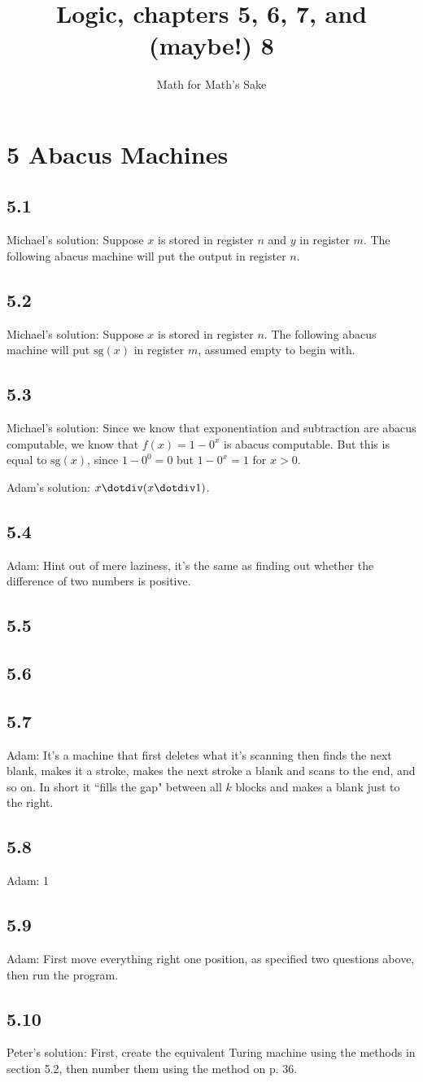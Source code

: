 \documentclass{article}
\title{Logic, chapters 5, 6, 7, and (maybe!) 8}
\author{Math for Math's Sake}
\newcommand\s{\section*}
\renewcommand\ss{\subsection*}
\newcommand\ms{Michael's solution: } %
\newcommand\pf{Peter's solution: } %
\begin{document}
\maketitle
\s{5 Abacus Machines}
\ss{5.1}
\ms Suppose $x$ is stored in register $n$ and $y$ in register $m$.  The following abacus machine will put the output in register $n$.

\begin{center}
\end{center}

\ss{5.2}
\ms Suppose $x$ is stored in register $n$.  The following abacus
machine will put $\mathrm{sg}(x)$ in register $m$, assumed empty to begin with.

\begin{center}
\end{center}
\ss{5.3}
\ms Since we know that exponentiation and subtraction are abacus computable, we know that $f(x)=1-0^x$ is abacus computable.  But this is equal to
$\mathrm{sg}(x)$, since $1-0^0 = 0$ but $1-0^x = 1$ for $x>0$.

Adam's solution: $x\dotdiv (x\dotdiv 1)$.
\ss{5.4} Adam: Hint out of mere laziness, it's the same as finding out whether the difference of two numbers is positive.  
\ss{5.5}
\ss{5.6}
\ss{5.7} Adam: It’s a machine that first deletes what it’s scanning then finds the next
blank, makes it a stroke, makes the next stroke a blank and scans to the
end, and so on. In short it ``fills the gap" between all $k$ blocks and makes
a blank just to the right.
\ss{5.8} Adam: 1
\ss{5.9} Adam: First move everything right one position, as specified two questions above,
then run the program.
\ss{5.10} 
\pf First, create the equivalent Turing machine using the methods in section 5.2, then number them using the method on p. 36.
\end{document}
